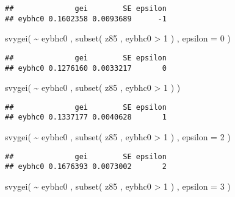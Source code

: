 \documentclass[
]{book}
\newenvironment{Shaded}{\begin{snugshade}}{\end{snugshade}}
\newcommand{\AttributeTok}[1]{\textcolor[rgb]{0.77,0.63,0.00}{#1}}
\newcommand{\DecValTok}[1]{\textcolor[rgb]{0.00,0.00,0.81}{#1}}
\newcommand{\FunctionTok}[1]{\textcolor[rgb]{0.00,0.00,0.00}{#1}}
\newcommand{\NormalTok}[1]{#1}
\newcommand{\SpecialCharTok}[1]{\textcolor[rgb]{0.00,0.00,0.00}{#1}}
\begin{document}
\begin{verbatim}
##              gei        SE epsilon
## eybhc0 0.1602358 0.0093689      -1
\end{verbatim}

\begin{Shaded}
\begin{Highlighting}[]
\FunctionTok{svygei}\NormalTok{( }\SpecialCharTok{\textasciitilde{}}\NormalTok{ eybhc0 , }\FunctionTok{subset}\NormalTok{( z85 , eybhc0 }\SpecialCharTok{\textgreater{}} \DecValTok{1}\NormalTok{ ) , }\AttributeTok{epsilon =} \DecValTok{0}\NormalTok{ )}
\end{Highlighting}
\end{Shaded}

\begin{verbatim}
##              gei        SE epsilon
## eybhc0 0.1276160 0.0033217       0
\end{verbatim}

\begin{Shaded}
\begin{Highlighting}[]
\FunctionTok{svygei}\NormalTok{( }\SpecialCharTok{\textasciitilde{}}\NormalTok{ eybhc0 , }\FunctionTok{subset}\NormalTok{( z85 , eybhc0 }\SpecialCharTok{\textgreater{}} \DecValTok{1}\NormalTok{ ) )}
\end{Highlighting}
\end{Shaded}

\begin{verbatim}
##              gei        SE epsilon
## eybhc0 0.1337177 0.0040628       1
\end{verbatim}

\begin{Shaded}
\begin{Highlighting}[]
\FunctionTok{svygei}\NormalTok{( }\SpecialCharTok{\textasciitilde{}}\NormalTok{ eybhc0 , }\FunctionTok{subset}\NormalTok{( z85 , eybhc0 }\SpecialCharTok{\textgreater{}} \DecValTok{1}\NormalTok{ ) , }\AttributeTok{epsilon =} \DecValTok{2}\NormalTok{ )}
\end{Highlighting}
\end{Shaded}

\begin{verbatim}
##              gei        SE epsilon
## eybhc0 0.1676393 0.0073002       2
\end{verbatim}

\begin{Shaded}
\begin{Highlighting}[]
\FunctionTok{svygei}\NormalTok{( }\SpecialCharTok{\textasciitilde{}}\NormalTok{ eybhc0 , }\FunctionTok{subset}\NormalTok{( z85 , eybhc0 }\SpecialCharTok{\textgreater{}} \DecValTok{1}\NormalTok{ ) , }\AttributeTok{epsilon =} \DecValTok{3}\NormalTok{ )}
\end{Highlighting}
\end{Shaded}
\end{document}
